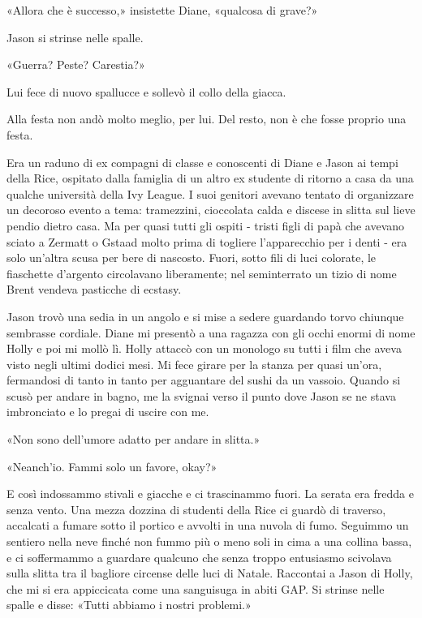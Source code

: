 «Allora che è successo,» insistette Diane, «qualcosa di grave?»

Jason si strinse nelle spalle.

«Guerra? Peste? Carestia?»

Lui fece di nuovo spallucce e sollevò il collo della giacca.

\separatorefiori

Alla festa non andò molto meglio, per lui. Del resto, non è che fosse
proprio una festa.

Era un raduno di ex compagni di classe e conoscenti di Diane e Jason ai
tempi della Rice, ospitato dalla famiglia di un altro ex studente di
ritorno a casa da una qualche università della Ivy League. I suoi
genitori avevano tentato di organizzare un decoroso evento a tema:
tramezzini, cioccolata calda e discese in slitta sul lieve pendio dietro
casa. Ma per quasi tutti gli ospiti - tristi figli di papà che avevano
sciato a Zermatt o Gstaad molto prima di togliere l'apparecchio per i
denti - era solo un'altra scusa per bere di nascosto. Fuori, sotto fili
di luci colorate, le fiaschette d'argento circolavano liberamente; nel
seminterrato un tizio di nome Brent vendeva pasticche di ecstasy.

Jason trovò una sedia in un angolo e si mise a sedere guardando torvo
chiunque sembrasse cordiale. Diane mi presentò a una ragazza con gli
occhi enormi di nome Holly e poi mi mollò lì. Holly attaccò con un
monologo su tutti i film che aveva visto negli ultimi dodici mesi. Mi
fece girare per la stanza per quasi un'ora, fermandosi di tanto in tanto
per agguantare del sushi da un vassoio. Quando si scusò per andare in
bagno, me la svignai verso il punto dove Jason se ne stava imbronciato e
lo pregai di uscire con me.

«Non sono dell'umore adatto per andare in slitta.»

«Neanch'io. Fammi solo un favore, okay?»

E così indossammo stivali e giacche e ci trascinammo fuori. La serata
era fredda e senza vento. Una mezza dozzina di studenti della Rice ci
guardò di traverso, accalcati a fumare sotto il portico e avvolti in una
nuvola di fumo. Seguimmo un sentiero nella neve finché non fummo più o
meno soli in cima a una collina bassa, e ci soffermammo a guardare
qualcuno che senza troppo entusiasmo scivolava sulla slitta tra il
bagliore circense delle luci di Natale. Raccontai a Jason di Holly, che
mi si era appiccicata come una sanguisuga in abiti GAP. Si strinse nelle
spalle e disse: «Tutti abbiamo i nostri problemi.»

